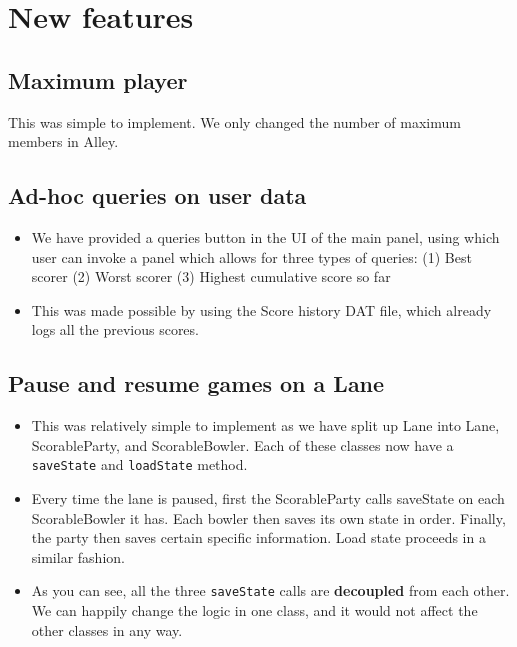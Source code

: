 \newcommand{\code}[1]{\texttt{#1}}

\section{New features}

\subsection{Maximum player}

This was simple to implement. We only changed the number of maximum members in Alley.

\subsection{Ad-hoc queries on user data}

\begin{itemize}
\item We have provided a queries button in the UI of the main panel, using which user can invoke a panel which allows for three types of queries: (1) Best scorer (2) Worst scorer (3) Highest cumulative score so far
\item This was made possible by using the Score history DAT file, which already logs all the previous scores.
\end{itemize}


\subsection{Pause and resume games on a Lane}

\begin{itemize}
\item This was relatively simple to implement as we have split up Lane into Lane, ScorableParty, and ScorableBowler. Each of these classes now have a \code{saveState} and \code{loadState} method.
\item Every time the lane is paused, first the ScorableParty calls saveState on each ScorableBowler it has. Each bowler then saves its own state in order. Finally, the party then saves certain specific information. Load state proceeds in a similar fashion.
\item As you can see, all the three \code{saveState} calls are \textbf{decoupled} from each other. We can happily change the logic in one class, and it would not affect the other classes in any way.
\end{itemize}
